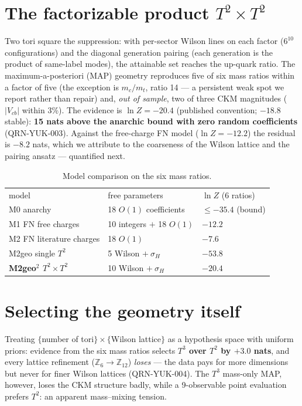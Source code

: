 \documentclass[aps,prd,preprint,nofootinbib]{revtex4-2}
\begin{document}
\section{The factorizable product $T^2\times T^2$}

Two tori square the suppression: with per-sector Wilson lines on each factor
($6^{10}$ configurations) and the diagonal generation pairing (each generation
is the product of same-label modes), the attainable set reaches the up-quark
ratio. The maximum-a-posteriori (MAP) geometry reproduces five of six mass
ratios within a factor of five (the exception is $m_c/m_t$, ratio 14 --- a
persistent weak spot we report rather than repair) and, \emph{out of sample},
two of three CKM magnitudes ($|V_{cb}|$ within 3\%). The evidence is $\ln
Z=-20.4$ (published convention; $-18.8$ stable): \textbf{15 nats above the
anarchic bound with zero random coefficients} (QRN-YUK-003). Against the
free-charge FN model ($\ln Z=-12.2$) the residual is $-8.2$ nats, which we
attribute to the coarseness of the Wilson lattice and the pairing ansatz ---
quantified next.

\begin{table}[t]
\caption{\label{tab:models}Model comparison on the six mass ratios.}
\begin{ruledtabular}
\begin{tabular}{lll}
model & free parameters & $\ln Z$ (6 ratios) \\
\colrule
M0 anarchy & 18 $O(1)$ coefficients & $\le -35.4$ (bound) \\
M1 FN free charges & 10 integers $+$ 18 $O(1)$ & $-12.2$ \\
M2 FN literature charges & 18 $O(1)$ & $-7.6$ \\
M2geo single $T^2$ & 5 Wilson $+\ \sigma_H$ & $-53.8$ \\
\textbf{M2geo$^2$ $T^2\times T^2$} & 10 Wilson $+\ \sigma_H$ & $\mathbf{-20.4}$ \\
\end{tabular}
\end{ruledtabular}
\end{table}

\section{Selecting the geometry itself}

Treating $\{$number of tori$\}\times\{$Wilson lattice$\}$ as a hypothesis space
with uniform priors: evidence from the six mass ratios selects \textbf{$T^3$
over $T^2$ by $+3.0$ nats}, and every lattice refinement
($\mathbb{Z}_6\to\mathbb{Z}_{12}$) \emph{loses} --- the data pays for more
dimensions but never for finer Wilson lattices (QRN-YUK-004). The $T^3$
mass-only MAP, however, loses the CKM structure badly, while a 9-observable
point evaluation prefers $T^2$: an apparent mass--mixing tension.
\end{document}
